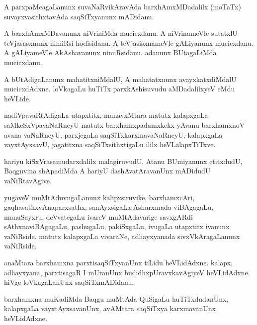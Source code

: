 \documentclass{article}
\begin{document}
\begin{mn}
A parxpaMcagaLanunx suvaNaRvikAravAda barxhAmxMDadalilx (moTaTx)
suvayxvasithxtavAda saqSiTxyanunx mADidanu.
\end{mn}

\begin{mn}%
A barxhAmxMDavanunx niVriniMda mucicxdanu. A niVrinameVle sutatxlU
teVjasasxnunx nimiRsi hodisidanu. A teVjasisxnameVle gALiyanunx
mucicxdanu. A gALiyameVle AkAshavanunx nimiRsidanu. adanunx
BUtagaLiMda mucicxdanu.
\end{mn}

\begin{mn}
A bUtAdigaLanunx mahatitxniMdalU, A mahatatxnunx avayxkatxdiMdalU
mucicxdAdxne. loVkagaLu huTiTx parxkAshisuvudu aMDadalilxyeV eMdu heVLide.
\end{mn}

\begin{mn}%
nadiVpavaRtAdigaLa utapxtitx, manavxMtara matutx kalapxgaLa
saMkeSxVpavaNaRneyU matutx barxhamxpadamxkekx yAvanu barxhamxnoV avana
vaNaRneyU, parxjegaLa saqSiTxkarxmavaNaRneyU, kalapxgaLa vayxtAyxsavU,
jagatitxna saqSiTxsithxtigaLu ililx heVLalapxTiTxve.
\end{mn}

\begin{mn}
hariyu kiSxVrasamudarxdalilx malagiruvudU, Atanu BUmiyanunx etitxdudU,
Baqguvina shApadiMda A hariyU dashAvatAravanUnx mADidudU vaNiRtavAgive.
\end{mn}

\begin{mn}
yugaveV muMtAduvugaLanunx kalipxsiruvike, barxhamxcAri,
gaqhasathxvAnaparxsathx, sanAyxsigaLa Asharxmada viBAgagaLu,
manuSayxru, deVvategaLu ivareV muMtAdavarige savxgARdi
sAthxnaviBAgagaLu, pashugaLu, pakiSxgaLu, ivugaLa utapxtitx ivanunx
vaNiRside. matutx kalapxgaLa vivaraNe, adhayxyanada sivxVkAragaLanunx vaNiRside.
\end{mn}

\begin{mn}
anaMtara barxhamxna parxtisaqSiTxyanUnx tiLidu heVLidAdxne. kalapx,
adhayxyana, parxtisagaR I mUranUnx budidhxpUravxkavAgiyeV
heVLidAdxne. hiVge loVkagaLanUnx saqSiTxmADidanu.
\end{mn}

\begin{mn}
barxhamxna muKadiMda Baqgu muMtAda QuSigaLu huTiTxdudanUnx, kalapxgaLa
vayxtAyxsavanUnx, avAMtara saqSiTxya karxmavanUnx heVLidAdxne.
\end{mn}
\end{document}
